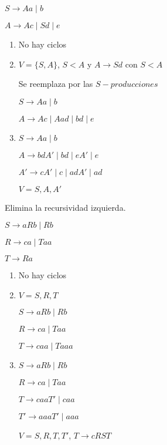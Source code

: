 \documentclass[12pt]{article}
\begin{document}
\begin{ejemplo}

  \begin{center}
    $S \rightarrow Aa \mid b$
  
    $A \rightarrow Ac \mid Sd \mid e$
    
  \end{center}
  \begin{enumerate}
    \item No hay ciclos
    \item $V = \{S, A\}$, $S < A$ y $A \rightarrow Sd$ con $S < A$

    Se reemplaza por las $S-producciones$

    $S \rightarrow Aa \mid b$

    $A \rightarrow Ac \mid Aad \mid bd \mid e$

    \item $S \rightarrow Aa \mid b$
    
    $A \rightarrow bdA' \mid bd \mid eA' \mid e$

    $A' \rightarrow cA' \mid c \mid adA' \mid ad$

    $V = {S, A, A'}$
  \end{enumerate}

\end{ejemplo}

\begin{ejercicio}
  Elimina la recursividad izquierda.

  $S \rightarrow aRb \mid Rb$

  $R \rightarrow ca \mid Taa$

  $T \rightarrow Ra$

  \begin{enumerate}
    \item No hay ciclos
    \item $V = {S, R, T}$
    
    $S \rightarrow aRb \mid Rb$

    $R \rightarrow ca \mid Taa$

    $T \rightarrow caa \mid Taaa$

    \item $S \rightarrow aRb \mid Rb$
    
    $R \rightarrow ca \mid Taa$

    $T \rightarrow caaT' \mid caa$

    $T' \rightarrow aaaT' \mid aaa$

    $V = {S, R, T, T'}$, $T \rightarrow cRST$
  \end{enumerate}

\end{ejercicio}
\end{document}

